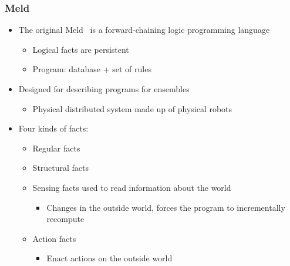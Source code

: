 \documentclass{beamer}
\begin{document}
\frame
{
   \frametitle{Meld}
   \begin{itemize}
      \item The original Meld~\cite{ashley-rollman-iclp09} is a forward-chaining logic programming language
      \begin{itemize}
         \item Logical facts are persistent
         \item Program: database + set of rules
      \end{itemize}
      
      \item Designed for describing programs for ensembles
      \begin{itemize}
         \item Physical distributed system made up of physical robots
      \end{itemize}
      
      \item Four kinds of facts:
      \begin{itemize}
         \item Regular facts
         \item Structural facts
         \item Sensing facts used to read information about the world
         \begin{itemize}
            \item Changes in the outside world, forces the program to incrementally recompute
         \end{itemize}
      
         \item Action facts
         \begin{itemize}
            \item Enact actions on the outside world
         \end{itemize}
      \end{itemize}
   \end{itemize}
}
\end{document}
